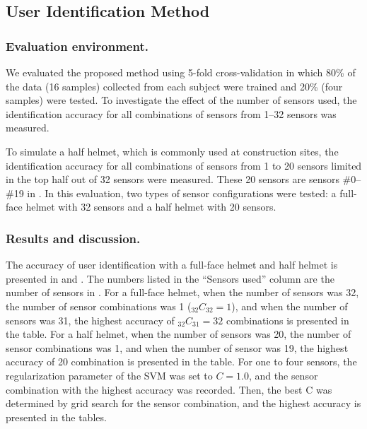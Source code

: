 \documentclass[english,preprint,JIP]{ipsj}
\begin{document}
\subsection{User Identification Method}


\subsubsection{Evaluation environment.}
We evaluated the proposed method using 5-fold cross-validation in which 80\% of the data (16 samples) collected from each subject were trained and 20\% (four samples) were tested. To investigate the effect of the number of sensors used, the identification accuracy for all combinations of sensors from 1–32 sensors was measured.\par

To simulate a half helmet, which is commonly used at construction sites, the identification accuracy for all combinations of sensors from 1 to 20 sensors limited in the top half out of 32 sensors were measured. These 20 sensors are sensors \#0--\#19 in . In this evaluation, two types of sensor configurations were tested: a full-face helmet with 32 sensors and a half helmet with 20 sensors.


\subsubsection{Results and discussion.}
The accuracy of user identification with a full-face helmet and half helmet is presented in  and . The numbers listed in the ``Sensors used'' column are the number of sensors in . For a full-face helmet, when the number of sensors was 32, the number of sensor combinations was 1 ($_{32}C_{32}=1$), and when the number of sensors was 31, the highest accuracy of $_{32}C_{31}=32$ combinations is presented in the table. For a half helmet, when the number of sensors was 20, the number of sensor combinations was 1, and when the number of sensor was 19, the highest accuracy of 20 combination is presented in the table. For one to four sensors, the regularization parameter of the SVM was set to $C=1.0$, and the sensor combination with the highest accuracy was recorded. Then, the best C was determined by grid search for the sensor combination, and the highest accuracy is presented in the tables.\par
\end{document}
